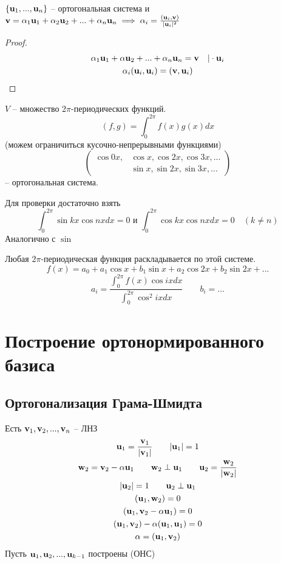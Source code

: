 \documentclass[main]{subfiles}
\begin{document}
\begin{assertion}
    $\{\mathbf{u}_1, ..., \mathbf{u}_n\}$ -- ортогональная система и
    $\mathbf{v} = \alpha_1 \mathbf{u}_1 + \alpha_2 \mathbf{u}_2 + ... + \alpha_n \mathbf{u}_n
        \implies \alpha_i = \frac{(\mathbf{u}_i, \mathbf{v})}{|\mathbf{u}_i|^2}$
\end{assertion}
\begin{proof}
    \begin{gather*}
        \alpha_1 \mathbf{u}_1 + \alpha \mathbf{u}_2 + ... + \alpha_n \mathbf{u}_n = \mathbf{v} \quad |\cdot \mathbf{u}_i\\
        \alpha_i(\mathbf{u}_i, \mathbf{u}_i) = (\mathbf{v}, \mathbf{u}_i)
    \end{gather*}
\end{proof}
\begin{example}
    $V$ -- множество $2\pi$-периодических функций.
    \[(f,g) = \int_0^{2\pi} f(x)g(x)dx\]
    (можем ограничиться кусочно-непрерывными функциями)
    \[\left(
        \begin{aligned}
                \cos0x, & \cos x, \cos 2x, \cos 3x, ... \\
                        & \sin x, \sin 2x, \sin 3x, ...
            \end{aligned}
        \right)\]
    -- ортогональная система.

    Для проверки достаточно взять
    \[\int_0^{2\pi} \sin kx \cos nx dx = 0 \text{ и }
        \int_0^{2\pi} \cos kx \cos nx dx =0 \quad (k\neq n)\]
    Аналогично с $\sin$

    Любая $2\pi$-периодическая функция раскладывается по этой системе.
    \[f(x) = a_0 + a_1 \cos x + b_1 \sin x + a_2 \cos 2x + b_2 \sin 2x + ...\]
    \[a_i = \frac{\int_0^{2\pi} f(x) \cos ix dx}{\int_0^{2\pi} \cos^2 ix dx} \qquad b_i=...\]
\end{example}


\section{Построение ортонормированного базиса}
\subsection{Ортогонализация Грама-Шмидта}
Есть $\mathbf{v}_1, \mathbf{v}_2, ..., \mathbf{v}_n$ -- ЛНЗ
\begin{gather*}
    \mathbf{u}_1 = \frac{\mathbf{v}_1}{|\mathbf{v}_1|} \qquad |\mathbf{u}_1| = 1\\
    \mathbf{w}_2 = \mathbf{v}_2 - \alpha \mathbf{u}_1 \qquad \mathbf{w}_2 \perp \mathbf{u}_1 \qquad \mathbf{u}_2 = \frac{\mathbf{w}_2}{|\mathbf{w}_2|}\\
    |\mathbf{u}_2|=1 \qquad \mathbf{u}_2 \perp \mathbf{u}_1\\
    (\mathbf{u}_1, \mathbf{w}_2) = 0\\
    (\mathbf{u}_1, \mathbf{v}_2 - \alpha \mathbf{u}_ 1) = 0\\
    (\mathbf{u}_1, \mathbf{v}_2) - \alpha (\mathbf{u}_1, \mathbf{u}_1)=0\\
    \alpha = (\mathbf{u}_1, \mathbf{v}_2)
\end{gather*}
Пусть $\mathbf{u}_1, \mathbf{u}_2, ..., \mathbf{u}_{k-1}$ построены (ОНС)
\end{document}
